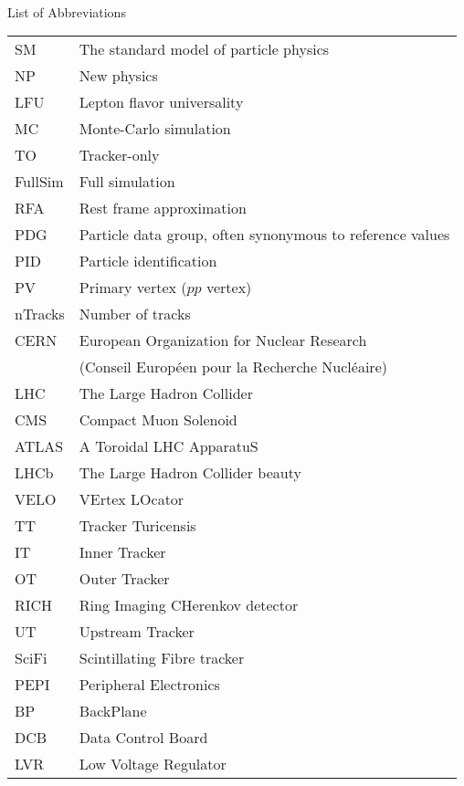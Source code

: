 \singlespacing \normalsize
\hbox{\ }

\vspace{.5in}

\begin{center}
\large{List of Abbreviations}
\end{center}

\vspace{3pt}

\begin{supertabular}{ll}
    SM      & The standard model of particle physics \\
    NP      & New physics \\
    LFU     & Lepton flavor universality \\
    MC      & Monte-Carlo simulation \\
    TO      & Tracker-only \\
    FullSim & Full simulation \\
    RFA     & Rest frame approximation \\
    PDG     & Particle data group, often synonymous to reference values \\
    PID     & Particle identification \\
    PV      & Primary vertex ($pp$ vertex) \\
    nTracks & Number of tracks \\
    CERN    & European Organization for Nuclear Research \\
            & (Conseil Européen pour la Recherche Nucléaire) \\
    LHC     & The Large Hadron Collider \\
    CMS     & Compact Muon Solenoid \\
    ATLAS   & A Toroidal LHC ApparatuS \\
    LHCb    & The Large Hadron Collider beauty \\
    VELO    & VErtex LOcator \\
    TT      & Tracker Turicensis \\
    IT      & Inner Tracker \\
    OT      & Outer Tracker \\
    RICH    & Ring Imaging CHerenkov detector \\
    UT      & Upstream Tracker \\
    SciFi   & Scintillating Fibre tracker \\
    PEPI    & Peripheral Electronics \\
    BP      & BackPlane \\
    DCB     & Data Control Board \\
    LVR     & Low Voltage Regulator \\
\end{supertabular}
